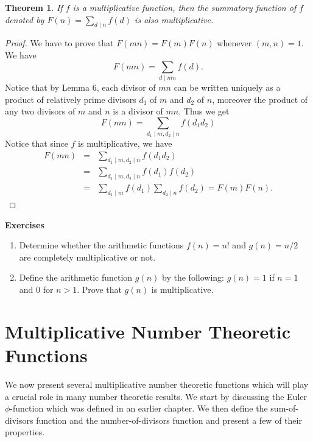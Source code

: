 \documentclass[12pt,letterpaper]{book}
\newtheorem{theorem}{Theorem}
\begin{document}
\begin{theorem}\label{summatory}
If $f$ is a multiplicative function, then the summatory function of
$f$ denoted by $F(n)=\sum_{d\mid n}f(d)$ is also multiplicative.
\end{theorem}

\begin{proof}
We have to prove that $F(mn)=F(m)F(n)$ whenever $(m,n)=1$.  We have
\begin{equation*}
F(mn)=\sum_{d\mid mn}f(d).
\end{equation*}
Notice that by Lemma 6, each divisor of $mn$ can be written uniquely
as a product of relatively prime divisors $d_1$ of $m$
 and $d_2$ of $n$, moreover the product of any two divisors of $m$
 and $n$ is a divisor of $mn$.  Thus we get
 \begin{equation*}
 F(mn)=\sum_{d_1\mid m, d_2\mid n}f(d_1d_2)
 \end{equation*}
 Notice that since $f$ is multiplicative, we have
 \begin{eqnarray*}
F(mn)&=& \sum_{d_1\mid m, d_2\mid n}f(d_1d_2)\\&=&\sum_{d_1\mid m,
d_2\mid n}f(d_1)f(d_2)\\&=&\sum_{d_1\mid m}f(d_1)\sum_{d_2\mid n}
f(d_2)=F(m)F(n).
 \end{eqnarray*}
\end{proof}

\textbf{Exercises}
\begin{enumerate}
\item{Determine whether the arithmetic functions $f(n)=n!$ and
$g(n)=n/2$ are completely multiplicative or not.} \item{Define the
arithmetic function $g(n)$ by the following:  $g(n)=1$ if $n=1$ and $0$
for $n>1$. Prove that $g(n)$ is multiplicative.}
\end{enumerate}

\newpage

\section{Multiplicative Number Theoretic Functions}
\par We now present several multiplicative number theoretic
functions which will play a crucial role in many number theoretic
results. We start by discussing the Euler $\phi$-function which was
defined in an earlier chapter.  We then define the sum-of-divisors
function and the number-of-divisors function and present a few of their
properties.
\end{document}
